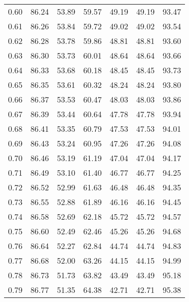 \begin{tabular}{|c|c|c|c|c|c|c|}
      0.60 &     86.24 &     53.89 &      59.57 &   49.19 &      49.19 &         93.47 \\
      0.61 &     86.26 &     53.84 &      59.72 &   49.02 &      49.02 &         93.54 \\
      0.62 &     86.28 &     53.78 &      59.86 &   48.81 &      48.81 &         93.60 \\
      0.63 &     86.30 &     53.73 &      60.01 &   48.64 &      48.64 &         93.66 \\
      0.64 &     86.33 &     53.68 &      60.18 &   48.45 &      48.45 &         93.73 \\
      0.65 &     86.35 &     53.61 &      60.32 &   48.24 &      48.24 &         93.80 \\
      0.66 &     86.37 &     53.53 &      60.47 &   48.03 &      48.03 &         93.86 \\
      0.67 &     86.39 &     53.44 &      60.64 &   47.78 &      47.78 &         93.94 \\
      0.68 &     86.41 &     53.35 &      60.79 &   47.53 &      47.53 &         94.01 \\
      0.69 &     86.43 &     53.24 &      60.95 &   47.26 &      47.26 &         94.08 \\
      0.70 &     86.46 &     53.19 &      61.19 &   47.04 &      47.04 &         94.17 \\
      0.71 &     86.49 &     53.10 &      61.40 &   46.77 &      46.77 &         94.25 \\
      0.72 &     86.52 &     52.99 &      61.63 &   46.48 &      46.48 &         94.35 \\
      0.73 &     86.55 &     52.88 &      61.89 &   46.16 &      46.16 &         94.45 \\
      0.74 &     86.58 &     52.69 &      62.18 &   45.72 &      45.72 &         94.57 \\
      0.75 &     86.60 &     52.49 &      62.46 &   45.26 &      45.26 &         94.68 \\
      0.76 &     86.64 &     52.27 &      62.84 &   44.74 &      44.74 &         94.83 \\
      0.77 &     86.68 &     52.00 &      63.26 &   44.15 &      44.15 &         94.99 \\
      0.78 &     86.73 &     51.73 &      63.82 &   43.49 &      43.49 &         95.18 \\
      0.79 &     86.77 &     51.35 &      64.38 &   42.71 &      42.71 &         95.38 \\

\end{tabular}
